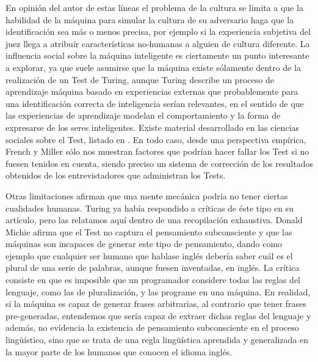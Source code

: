 \documentclass[12pt]{memoir}
\begin{document}
En opinión del autor de estas líneas el problema de la cultura se limita a que la habilidad de la máquina para simular la cultura de su adversario haga que la identificación sea más o menos precisa, por ejemplo si la experiencia subjetiva del juez llega a atribuír características no-humanas a alguien de cultura diferente. La influencia social sobre la máquina inteligente es ciertamente un punto interesante a explorar, ya que suele asumirse que la máquina existe sólamente dentro de la realización de un Test de Turing, aunque Turing describe un proceso de aprendizaje máquina basado en experiencias externas \parencite[apartado 7]{Turing1950cmi} que probablemente para una identificación correcta de inteligencia serían relevantes, en el sentido de que las experiencias de aprendizaje modelan el comportamiento y la forma de expresarse de los seres inteligentes. Existe material desarrollado en las ciencias sociales sobre el Test, listado en \parencite[apartado 5]{afterTuring}. En todo caso, desde una perspectiva empírica, French y Miller sólo nos muestran factores que podrían hacer fallar los Test si no fuesen tenidos en cuenta, siendo preciso un sistema de corrección de los resultados obtenidos de los entrevistadores que administran los Tests.

Otras limitaciones afirman que una mente mecánica podría no tener ciertas cualidades humanas. Turing ya había respondido a críticas de éste tipo en su artículo, pero las relatamos aquí dentro de una recopilación exhaustiva. Donald Michie \parencite[apartado 4.3]{afterTuring} afirma que el Test no captura el pensamiento subconsciente y que las máquinas son incapaces de generar este tipo de pensamiento, dando como ejemplo que cualquier ser humano que hablase inglés debería saber cuál es el plural de una serie de palabras, aunque fuesen inventadas, en inglés. La crítica consiste en que es imposible que un programador considere todas las reglas del lenguaje, como las de pluralización, y las programe en una máquina. En realidad, si la máquina es capaz de generar frases arbitrarias, al contrario que tener frases pre-generadas, entendemos que sería capaz de extraer dichas reglas del lenguaje y además, no evidencia la existencia de pensamiento subconsciente en el proceso lingüístico, sino que se trata de una regla lingüística aprendida y generalizada en la mayor parte de los humanos que conocen el idioma inglés.
\end{document}

